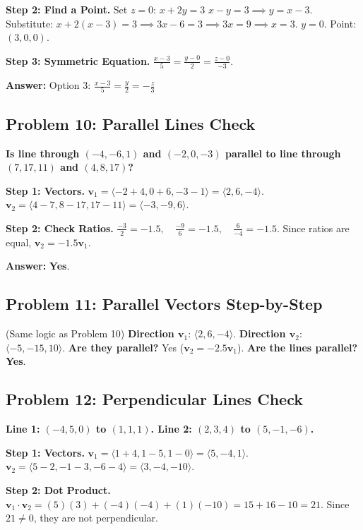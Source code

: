 \documentclass[11pt]{article}
\begin{document}
\textbf{Step 2: Find a Point.}
Set $z=0$:
$x + 2y = 3$
$x - y = 3 \implies y = x-3$.
Substitute: $x + 2(x-3) = 3 \implies 3x - 6 = 3 \implies 3x=9 \implies x=3$.
$y = 0$.
Point: $(3, 0, 0)$.

\textbf{Step 3: Symmetric Equation.}
$\frac{x-3}{5} = \frac{y-0}{2} = \frac{z-0}{-3}$.

\textbf{Answer:}
Option 3: $\frac{x-3}{5} = \frac{y}{2} = -\frac{z}{3}$

\hrulefill

\subsection*{Problem 10: Parallel Lines Check}
\textbf{Is line through $(-4, -6, 1)$ and $(-2, 0, -3)$ parallel to line through $(7, 17, 11)$ and $(4, 8, 17)$?}

\textbf{Step 1: Vectors.}
$\mathbf{v}_1 = \langle -2+4, 0+6, -3-1 \rangle = \langle 2, 6, -4 \rangle$.
$\mathbf{v}_2 = \langle 4-7, 8-17, 17-11 \rangle = \langle -3, -9, 6 \rangle$.

\textbf{Step 2: Check Ratios.}
$\frac{-3}{2} = -1.5, \quad \frac{-9}{6} = -1.5, \quad \frac{6}{-4} = -1.5$.
Since ratios are equal, $\mathbf{v}_2 = -1.5 \mathbf{v}_1$.

\textbf{Answer:}
\textbf{Yes}.

\hrulefill

\subsection*{Problem 11: Parallel Vectors Step-by-Step}
(Same logic as Problem 10)
\textbf{Direction $\mathbf{v}_1$}: $\langle 2, 6, -4 \rangle$.
\textbf{Direction $\mathbf{v}_2$}: $\langle -5, -15, 10 \rangle$.
\textbf{Are they parallel?} Yes ($\mathbf{v}_2 = -2.5 \mathbf{v}_1$).
\textbf{Are the lines parallel?} \textbf{Yes}.

\hrulefill

\subsection*{Problem 12: Perpendicular Lines Check}
\textbf{Line 1: $(-4, 5, 0)$ to $(1, 1, 1)$. Line 2: $(2, 3, 4)$ to $(5, -1, -6)$.}

\textbf{Step 1: Vectors.}
$\mathbf{v}_1 = \langle 1+4, 1-5, 1-0 \rangle = \langle 5, -4, 1 \rangle$.
$\mathbf{v}_2 = \langle 5-2, -1-3, -6-4 \rangle = \langle 3, -4, -10 \rangle$.

\textbf{Step 2: Dot Product.}
$\mathbf{v}_1 \cdot \mathbf{v}_2 = (5)(3) + (-4)(-4) + (1)(-10) = 15 + 16 - 10 = 21$.
Since $21 \neq 0$, they are not perpendicular.
\end{document}
